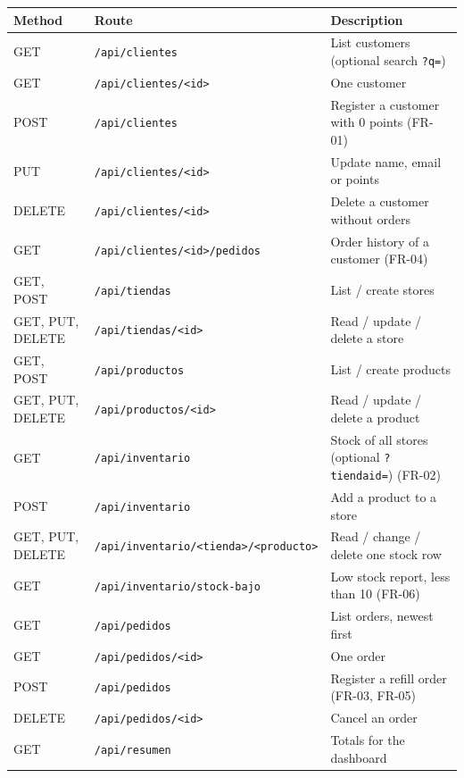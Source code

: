 \documentclass[11pt]{article}
\renewcommand{\_}{\oldus\allowbreak}
\begin{document}
\begin{center}
\small
\begin{longtable}{>{\raggedright}p{2.5cm} >{\raggedright}p{5.4cm} p{6.4cm}}
\toprule
\textbf{Method} & \textbf{Route} & \textbf{Description} \\
\midrule
\endhead
GET & \texttt{/api/clientes} & List customers (optional search \texttt{?q=}) \\
GET & \texttt{/api/clientes/<id>} & One customer \\
POST & \texttt{/api/clientes} & Register a customer with 0 points (FR-01) \\
PUT & \texttt{/api/clientes/<id>} & Update name, email or points \\
DELETE & \texttt{/api/clientes/<id>} & Delete a customer without orders \\
GET & \texttt{/api/clientes/<id>/pedidos} & Order history of a customer (FR-04) \\
\midrule
GET, POST & \texttt{/api/tiendas} & List / create stores \\
GET, PUT, DELETE & \texttt{/api/tiendas/<id>} & Read / update / delete a store \\
\midrule
GET, POST & \texttt{/api/productos} & List / create products \\
GET, PUT, DELETE & \texttt{/api/productos/<id>} & Read / update / delete a product \\
\midrule
GET & \texttt{/api/inventario} & Stock of all stores (optional \texttt{?tienda\_id=}) (FR-02) \\
POST & \texttt{/api/inventario} & Add a product to a store \\
GET, PUT, DELETE & \texttt{/api/inventario/\allowbreak<tienda>/<producto>} & Read / change / delete one stock row \\
GET & \texttt{/api/inventario/stock-bajo} & Low stock report, less than 10 (FR-06) \\
\midrule
GET & \texttt{/api/pedidos} & List orders, newest first \\
GET & \texttt{/api/pedidos/<id>} & One order \\
POST & \texttt{/api/pedidos} & Register a refill order (FR-03, FR-05) \\
DELETE & \texttt{/api/pedidos/<id>} & Cancel an order \\
\midrule
GET & \texttt{/api/resumen} & Totals for the dashboard \\
\bottomrule
\end{longtable}
\end{center}
\end{document}
